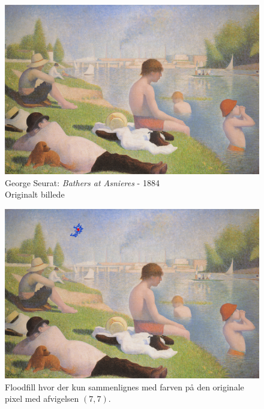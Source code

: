 {%
\begin{figure}[!h]
    \begin{center}
        \includegraphics[scale=8]{afsnit/vores_implementation/billeder/flood_fill/seurat_bathers}
    \end{center}
    \caption[George Seurat: \emph{Bathers at Asnieres} - 1884]{George
    Seurat: \emph{Bathers at Asnieres} - 1884\\Originalt billede}
    \label{bathers}
\end{figure}

\begin{figure}[!h]
    \begin{center}
        \includegraphics[scale=0.49]{afsnit/vores_implementation/billeder/flood_fill/dot_ff_fixed_7_7}
    \end{center}
    \caption[]{Floodfill hvor der kun sammenlignes med farven på den
    originale pixel med afvigelsen $(7,7)$.}
    \label{dot_ff_fixed_7_7}
\end{figure}

}
